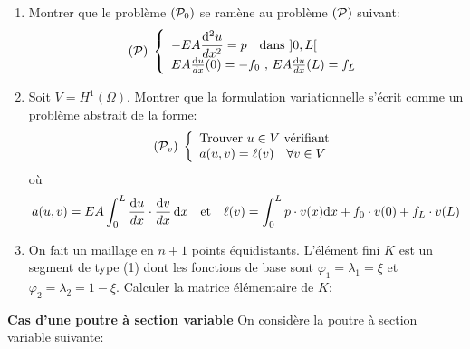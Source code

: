 \documentclass{article}
\def \de {{\rm d}}
\begin{document}
\begin{enumerate}
\item Montrer que le problème $({\cal P}_0)$ se ramène au problème  $({\cal P})$ suivant:
\[
({\cal P})\;\left\{
\begin{array}{l}
-\displaystyle EA\frac{\de^2 u}{dx^2}=p\quad \mbox{dans } ]0,L[\\
 EA\frac{\de u}{dx}(0)=-f_0 \mbox{ , } EA\frac{\de u}{dx}(L)=f_L
\end{array}
\right.
\]
\item Soit $V=H^1(\Omega)$. Montrer que la formulation variationnelle s'écrit comme un problème abstrait de la forme:
\[
({\cal P}_v)\;\left\{
\begin{array}{l}
\mbox{Trouver } u\in V \mbox{ vérifiant}\\
a(u,v)=\ell(v)\quad \forall v\in V
\end{array}
\right.
\]
où \[ a(u,v)=\displaystyle EA\int_0^L\frac{\de u}{dx}\cdot \frac{\de v}{dx}\,\de x\quad
\mbox{et} \quad \ell(v)=\displaystyle \int_0^L p\cdot v(x)\de x+f_0 \cdot v(0)+f_L \cdot v(L)\]
\item On fait un maillage en $n+1$ points équidistants. L'élément fini $K$ est un segment de type (1) dont les fonctions de base sont  $\varphi_1=\lambda_1=\xi$ et $\varphi_2=\lambda_2=1-\xi$.  Calculer la matrice élémentaire de $K$:
\end{enumerate}
{\bf Cas d'une poutre à section variable} On considère la poutre à section variable suivante:
\end{document}
